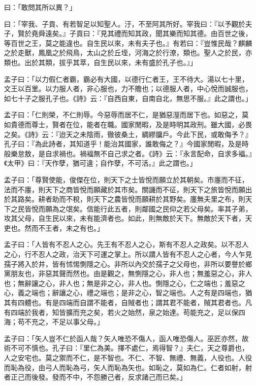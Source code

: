 \begin{pinyinscope}
曰：「敢問其所以異？」

曰：「宰我、子貢、有若智足以知聖人。汙，不至阿其所好。宰我曰：『以予觀於夫子，賢於堯舜遠矣。』子貢曰：『見其禮而知其政，聞其樂而知其德。由百世之後，等百世之王，莫之能違也。自生民以來，未有夫子也。』有若曰：『豈惟民哉？麒麟之於走獸，鳳凰之於飛鳥，太山之於丘垤，河海之於行潦，類也。聖人之於民，亦類也。出於其類，拔乎其萃，自生民以來，未有盛於孔子也。』」

孟子曰：「以力假仁者霸，霸必有大國，以德行仁者王，王不待大。湯以七十里，文王以百里。以力服人者，非心服也，力不贍也；以德服人者，中心悅而誠服也，如七十子之服孔子也。《詩》云：『自西自東，自南自北，無思不服。』此之謂也。」

孟子曰：「仁則榮，不仁則辱。今惡辱而居不仁，是猶惡溼而居下也。如惡之，莫如貴德而尊士，賢者在位，能者在職。國家閒暇，及是時明其政刑。雖大國，必畏之矣。《詩》云：『迨天之未陰雨，徹彼桑土，綢繆牖戶。今此下民，或敢侮予？』孔子曰：『為此詩者，其知道乎！能治其國家，誰敢侮之？』今國家閒暇，及是時般樂怠敖，是自求禍也。禍褔無不自己求之者。《詩》云：『永言配命，自求多褔。』《太甲》曰：『天作孽，猶可違；自作孽，不可活。』此之謂也。」

孟子曰：「尊賢使能，俊傑在位，則天下之士皆悅而願立於其朝矣。市廛而不征，法而不廛，則天下之商皆悅而願藏於其市矣。關譏而不征，則天下之旅皆悅而願出於其路矣。耕者助而不稅，則天下之農皆悅而願耕於其野矣。廛無夫里之布，則天下之民皆悅而願為之氓矣。信能行此五者，則鄰國之民仰之若父母矣。率其子弟，攻其父母，自生民以來，未有能濟者也。如此，則無敵於天下。無敵於天下者，天吏也。然而不王者，未之有也。」

孟子曰：「人皆有不忍人之心。先王有不忍人之心，斯有不忍人之政矣。以不忍人之心，行不忍人之政，治天下可運之掌上。所以謂人皆有不忍人之心者，今人乍見孺子將入於井，皆有怵惕惻隱之心。非所以內交於孺子之父母也，非所以要譽於鄉黨朋友也，非惡其聲而然也。由是觀之，無惻隱之心，非人也；無羞惡之心，非人也；無辭讓之心，非人也；無是非之心，非人也。惻隱之心，仁之端也；羞惡之心，義之端也；辭讓之心，禮之端也；是非之心，智之端也。人之有是四端也，猶其有四體也。有是四端而自謂不能者，自賊者也；謂其君不能者，賊其君者也。凡有四端於我者，知皆擴而充之矣，若火之始然，泉之始達。苟能充之，足以保四海；苟不充之，不足以事父母。」

孟子曰：「矢人豈不仁於函人哉？矢人唯恐不傷人，函人唯恐傷人。巫匠亦然，故術不可不慎也。孔子曰：『里仁為美。擇不處仁，焉得智？』夫仁，天之尊爵也，人之安宅也。莫之禦而不仁，是不智也。不仁、不智、無禮、無義，人役也。人役而恥為役，由弓人而恥為弓，矢人而恥為矢也。如恥之，莫如為仁。仁者如射，射者正己而後發。發而不中，不怨勝己者，反求諸己而已矣。」


\end{pinyinscope}
